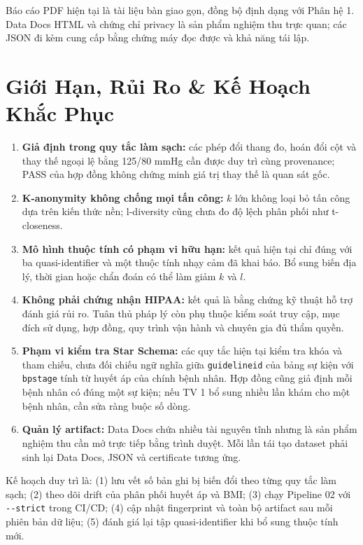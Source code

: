 \documentclass[11pt,a4paper]{article}
\renewcommand{\_}{\texorpdfstring{\origunderscore\allowbreak}{\origunderscore}}
\begin{document}
Báo cáo PDF hiện tại là tài liệu bàn giao gọn, đồng bộ định dạng với Phân hệ 1. Data Docs HTML và chứng chỉ privacy là sản phẩm nghiệm thu trực quan; các JSON đi kèm cung cấp bằng chứng máy đọc được và khả năng tái lập.

\section{Giới Hạn, Rủi Ro \& Kế Hoạch Khắc Phục}

\begin{enumerate}
    \item \textbf{Giả định trong quy tắc làm sạch:} các phép đổi thang đo, hoán đổi cột và thay thế ngoại lệ bằng 125/80 mmHg cần được duy trì cùng provenance; PASS của hợp đồng không chứng minh giá trị thay thế là quan sát gốc.
    \item \textbf{K-anonymity không chống mọi tấn công:} $k$ lớn không loại bỏ tấn công dựa trên kiến thức nền; l-diversity cũng chưa đo độ lệch phân phối như t-closeness.
    \item \textbf{Mô hình thuộc tính có phạm vi hữu hạn:} kết quả hiện tại chỉ đúng với ba quasi-identifier và một thuộc tính nhạy cảm đã khai báo. Bổ sung biến địa lý, thời gian hoặc chẩn đoán có thể làm giảm $k$ và $l$.
    \item \textbf{Không phải chứng nhận HIPAA:} kết quả là bằng chứng kỹ thuật hỗ trợ đánh giá rủi ro. Tuân thủ pháp lý còn phụ thuộc kiểm soát truy cập, mục đích sử dụng, hợp đồng, quy trình vận hành và chuyên gia đủ thẩm quyền.
    \item \textbf{Phạm vi kiểm tra Star Schema:} các quy tắc hiện tại kiểm tra khóa và tham chiếu, chưa đối chiếu ngữ nghĩa giữa \texttt{guideline\_id} của bảng sự kiện với \texttt{bp\_stage} tính từ huyết áp của chính bệnh nhân. Hợp đồng cũng giả định mỗi bệnh nhân có đúng một sự kiện; nếu TV 1 bổ sung nhiều lần khám cho một bệnh nhân, cần sửa ràng buộc số dòng.
    \item \textbf{Quản lý artifact:} Data Docs chứa nhiều tài nguyên tĩnh nhưng là sản phẩm nghiệm thu cần mở trực tiếp bằng trình duyệt. Mỗi lần tái tạo dataset phải sinh lại Data Docs, JSON và certificate tương ứng.
\end{enumerate}

Kế hoạch duy trì là: (1) lưu vết số bản ghi bị biến đổi theo từng quy tắc làm sạch; (2) theo dõi drift của phân phối huyết áp và BMI; (3) chạy Pipeline 02 với \texttt{-{}-strict} trong CI/CD; (4) cập nhật fingerprint và toàn bộ artifact sau mỗi phiên bản dữ liệu; (5) đánh giá lại tập quasi-identifier khi bổ sung thuộc tính mới.
\end{document}
